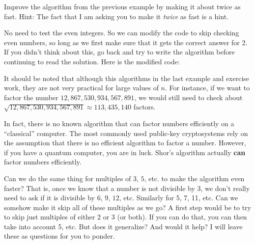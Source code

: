\begin{exer}
Improve the algorithm from the previous example
by making it about twice as fast. Hint: The fact that
I am asking you to make it {\em twice} as fast is a hint.

\vspace*{3.5in}
\begin{answer}
No need to test the even integers. So
we can modify the code to skip checking even numbers,
so long as we first make sure that it gets the correct
answer for 2. If you didn't think about this,
go back and try to write the algorithm before
continuing to read the solution. 
Here is the modified code:
\end{answer}
\end{exer}

\begin{rem}
It should be noted that although this algorithms in the last
example and exercise work, 
they are not very practical for large values of $n$.
For instance, if we want to factor the number 
$12,867,530,934,567,891$,
we would still need to check about 
$\sqrt{12,867,530,934,567,891}\approx 113,435,140$ factors.

In fact, there is no known algorithm that can factor numbers efficiently on a ``classical'' computer.
The most commonly used public-key cryptosystems rely on the assumption that there is no efficient algorithm
to factor a number.  
However, if you have a quantum computer, you are in luck.  
Shor's algorithm actually {\bf can} factor numbers efficiently.
\end{rem}

Can we do the same thing for multiples of $3$, $5$, etc.
to make the algorithm even faster? 
That is, once we know that a number is not divisible by $3$, we don't really need
to ask if it is divisible by $6$, $9$, $12$, etc.  Similarly for 5, 7, 11, etc. Can we somehow make it skip all of these multiples as we go?
A first step would be to try to skip just multiples of either 2 or 3 (or both). If you can do that, you can then take into account 5, etc.
But does it generalize? And would it help? I will leave these as
questions for you to ponder.




